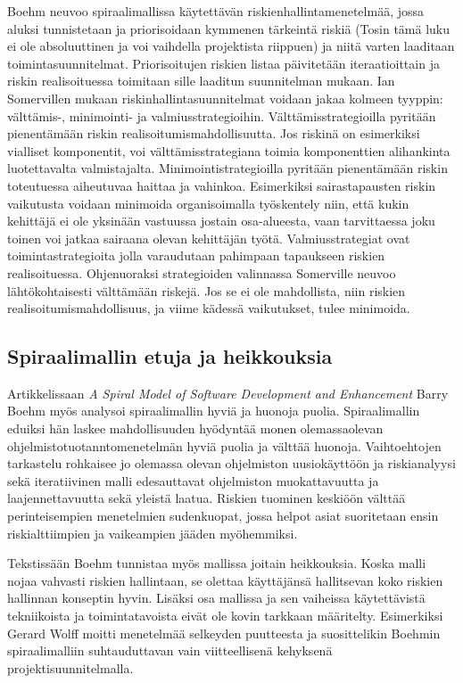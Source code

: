 \documentclass[finnish,12pt]{tktltiki2}
\theoremstyle{definition}
\theoremstyle{remark}
\begin{document}
Boehm neuvoo spiraalimallissa käytettävän riskienhallintamenetelmää, jossa aluksi tunnistetaan ja priorisoidaan kymmenen tärkeintä riskiä (Tosin tämä luku ei ole absoluuttinen ja voi vaihdella projektista riippuen) ja niitä varten laaditaan toimintasuunnitelmat. Priorisoitujen riskien listaa päivitetään iteraatioittain ja riskin realisoituessa toimitaan sille laaditun suunnitelman mukaan\cite{Boehm:1988:SMS:45797.45801}. Ian Somervillen mukaan riskinhallintasuunnitelmat voidaan jakaa kolmeen tyyppin: välttämis-, minimointi- ja valmiusstrategioihin\cite{Sommerville10}. Välttämisstrategioilla pyritään pienentämään riskin realisoitumismahdollisuutta. Jos riskinä on esimerkiksi vialliset komponentit, voi välttämisstrategiana toimia komponenttien alihankinta luotettavalta valmistajalta. Minimointistrategioilla pyritään pienentämään riskin toteutuessa aiheutuvaa haittaa ja vahinkoa. Esimerkiksi sairastapausten riskin vaikutusta voidaan minimoida organisoimalla työskentely niin, että kukin kehittäjä ei ole yksinään vastuussa jostain osa-alueesta, vaan tarvittaessa joku toinen voi jatkaa sairaana olevan kehittäjän työtä. Valmiusstrategiat ovat toimintastrategioita jolla varaudutaan pahimpaan tapaukseen riskien realisoituessa. Ohjenuoraksi strategioiden valinnassa Somerville neuvoo lähtökohtaisesti välttämään riskejä. Jos se ei ole mahdollista, niin riskien realisoitumismahdollisuus, ja viime kädessä vaikutukset, tulee minimoida.

\subsection{Spiraalimallin etuja ja heikkouksia}

Artikkelissaan \textit{A Spiral Model of Software Development and Enhancement} Barry Boehm myös analysoi spiraalimallin hyviä ja huonoja puolia. Spiraalimallin eduiksi hän laskee mahdollisuuden hyödyntää monen olemassaolevan ohjelmistotuotanntomenetelmän hyviä puolia ja välttää huonoja\cite{Boehm:1988:SMS:45797.45801}. Vaihtoehtojen tarkastelu rohkaisee jo olemassa olevan ohjelmiston uusiokäyttöön ja riskianalyysi sekä iteratiivinen malli edesauttavat ohjelmiston muokattavuutta ja laajennettavuutta sekä yleistä laatua. Riskien tuominen keskiöön välttää perinteisempien menetelmien sudenkuopat, jossa helpot asiat suoritetaan ensin riskialttiimpien ja vaikeampien jääden myöhemmiksi\cite{Wolff:1989:MRS:107446.107478}. 

Tekstissään Boehm tunnistaa myös mallissa joitain heikkouksia. Koska malli nojaa vahvasti riskien hallintaan, se olettaa käyttäjänsä hallitsevan koko riskien hallinnan konseptin hyvin\cite{Boehm:1988:SMS:45797.45801}. Lisäksi osa mallissa ja sen vaiheissa käytettävistä tekniikoista ja toimintatavoista eivät ole kovin tarkkaan määritelty. Esimerkiksi Gerard Wolff moitti menetelmää selkeyden puutteesta ja suosittelikin Boehmin spiraalimalliin suhtauduttavan vain viitteellisenä kehyksenä projektisuunnitelmalla\cite{Wolff:1989:MRS:107446.107478}. 
\end{document}

